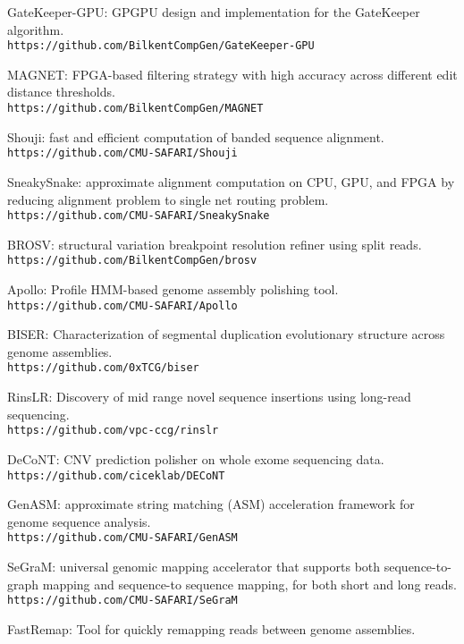 \begin{list2}
  \clearpage
  \item
  GateKeeper-GPU: GPGPU design and implementation for the GateKeeper algorithm.\\
  {\tt https://github.com/BilkentCompGen/GateKeeper-GPU}

\item
  MAGNET: FPGA-based filtering strategy with high accuracy across different edit distance thresholds.\\
  {\tt https://github.com/BilkentCompGen/MAGNET}

  
\item
  Shouji: fast and efficient computation of banded sequence alignment.\\
  {\tt https://github.com/CMU-SAFARI/Shouji}
\item
  SneakySnake: approximate alignment computation on CPU, GPU, and FPGA by reducing alignment problem to single net routing problem.
  {\tt https://github.com/CMU-SAFARI/SneakySnake}
\item
  BROSV: structural variation breakpoint resolution refiner using split reads.\\
  {\tt https://github.com/BilkentCompGen/brosv}
  \item
  Apollo: Profile HMM-based genome assembly polishing tool.
  {\tt https://github.com/CMU-SAFARI/Apollo}
  \item
  BISER: Characterization of segmental duplication evolutionary structure across  genome assemblies.\\
  {\tt https://github.com/0xTCG/biser}
  \item
  RinsLR: Discovery of mid range novel sequence insertions using long-read sequencing.\\
  {\tt https://github.com/vpc-ccg/rinslr}
  \item
DeCoNT: CNV prediction polisher on whole exome sequencing data.\\
{\tt https://github.com/ciceklab/DECoNT}
  \item
GenASM: approximate string matching (ASM) acceleration framework for genome sequence analysis.\\
  {\tt https://github.com/CMU-SAFARI/GenASM}
  \item
  SeGraM: universal genomic mapping accelerator that supports both sequence-to-graph mapping and sequence-to   sequence mapping, for both short and long reads.\\
{\tt https://github.com/CMU-SAFARI/SeGraM}
  \item
FastRemap: Tool for quickly remapping reads between genome assemblies.\\

\end{list2}
